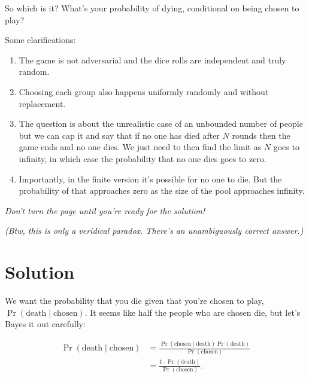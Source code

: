 \documentclass[article,twocolumn]{memoir}
\begin{document}
\vspace{1em}

So which is it? 
What's your probability of dying, conditional on being chosen to play?

\newpage

Some clarifications:

\begin{enumerate}
\item The game is not adversarial and the dice rolls are independent and truly random.
\item Choosing each group also happens uniformly randomly and without replacement.
\item The question is about the unrealistic case of an unbounded number of people but we can cap it and say that if no one has died after $N$ rounds then the game ends and no one dies. 
We just need to then find the limit as $N$ goes to infinity, in which case the probability that no one dies goes to zero.
\item Importantly, in the finite version it's possible for no one to die. 
But the probability of that approaches zero as the size of the pool approaches infinity.
\end{enumerate}

\vspace{2em}
\noindent
\emph{Don't turn the page until you're ready for the solution!}

\vspace{2em}
\noindent
\emph{(Btw, this is only a veridical paradox. There's an unambiguously correct answer.)}

\newpage

\chapter*{Solution}

We want the probability that you die given that you're chosen to play, 
$\Pr(\text{death} \mid \text{chosen})$.
It seems like half the people who are chosen die, but let's Bayes it out carefully:

\begin{equation*}
\begin{split}
\Pr(\text{death} \mid \text{chosen}) & =
\frac{\Pr(\text{chosen} \mid \text{death}) \Pr(\text{death})}{\Pr(\text{chosen})} \\
& = \frac{1\cdot\Pr(\text{death})}{\Pr(\text{chosen})}.
\end{split}
\end{equation*}
\end{document}
